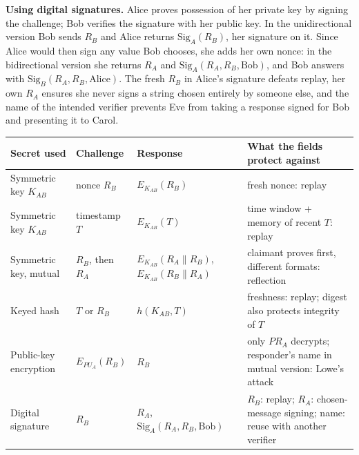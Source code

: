 \textbf{Using digital signatures.} Alice proves possession of her private key by signing the challenge; Bob verifies the signature with her public key. In the unidirectional version Bob sends $R_B$ and Alice returns $\mathrm{Sig}_A(R_B)$, her signature on it. Since Alice would then sign any value Bob chooses, she adds her own nonce: in the bidirectional version she returns $R_A$ and $\mathrm{Sig}_A(R_A, R_B, \text{Bob})$, and Bob answers with $\mathrm{Sig}_B(R_A, R_B, \text{Alice})$. The fresh $R_B$ in Alice's signature defeats replay, her own $R_A$ ensures she never signs a string chosen entirely by someone else, and the name of the intended verifier prevents Eve from taking a response signed for Bob and presenting it to Carol.
\begin{center}
\hspace{1.2cm}%
\end{center}

\begin{center}\small
\begin{tabularx}{\textwidth}{@{}l l l X@{}}
\toprule
Secret used & Challenge & Response & What the fields protect against\\
\midrule
Symmetric key $K_{AB}$ & nonce $R_B$ & $E_{K_{AB}}(R_B)$ & fresh nonce: replay\\
Symmetric key $K_{AB}$ & timestamp $T$ & $E_{K_{AB}}(T)$ & time window + memory of recent $T$: replay\\
Symmetric key, mutual & $R_B$, then $R_A$ & $E_{K_{AB}}(R_A \| R_B)$, $E_{K_{AB}}(R_B \| R_A)$ & claimant proves first, different formats: reflection\\
Keyed hash & $T$ or $R_B$ & $h(K_{AB}, T)$ & freshness: replay; digest also protects integrity of $T$\\
Public-key encryption & $E_{PU_A}(R_B)$ & $R_B$ & only $PR_A$ decrypts; responder's name in mutual version: Lowe's attack\\
Digital signature & $R_B$ & $R_A$, $\mathrm{Sig}_A(R_A, R_B, \text{Bob})$ & $R_B$: replay; $R_A$: chosen-message signing; name: reuse with another verifier\\
\bottomrule
\end{tabularx}
\end{center}

